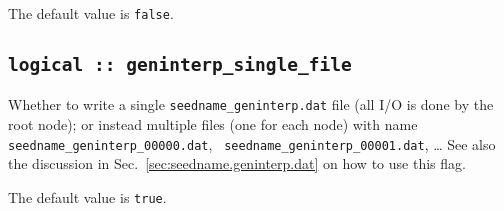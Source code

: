 The default value is \verb#false#.

\subsection[geninterp\_alsofirstder]{\tt logical :: geninterp\_single\_file}
Whether to write a single  {\tt seedname\_geninterp.dat} file (all I/O is done by the root node); or
instead multiple files (one for each node) with
name {\tt seedname\_geninterp\_00000.dat}, {\tt
  seedname\_geninterp\_00001.dat}, \ldots
See also the discussion in Sec.~\ref{sec:seedname.geninterp.dat} on
how to use this flag.

The default value is \verb#true#.
